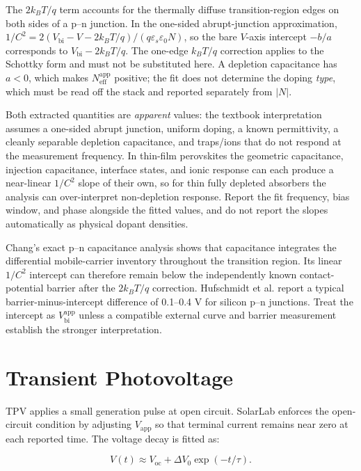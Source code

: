 \documentclass[
  11pt,
  american,
]{report}
\begin{document}
The \(2k_BT/q\) term accounts for the thermally diffuse
transition-region edges on both sides of a p--n junction. In the
one-sided abrupt-junction approximation,
\(1/C^2 = 2(V_\mathrm{bi}-V-2k_BT/q)/(q\varepsilon_s\varepsilon_0 N)\),
so the bare \(V\)-axis intercept \(-b/a\) corresponds to
\(V_\mathrm{bi}-2k_BT/q\). The one-edge \(k_BT/q\) correction applies to
the Schottky form and must not be substituted here. A depletion
capacitance has \(a<0\), which makes \(N_\mathrm{eff}^\mathrm{app}\)
positive; the fit does not determine the doping \emph{type}, which must
be read off the stack and reported separately from \(|N|\).

Both extracted quantities are \emph{apparent} values: the textbook
interpretation assumes a one-sided abrupt junction, uniform doping, a
known permittivity, a cleanly separable depletion capacitance, and
traps/ions that do not respond at the measurement frequency. In
thin-film perovskites the geometric capacitance, injection capacitance,
interface states, and ionic response can each produce a near-linear
\(1/C^2\) slope of their own, so for thin fully depleted absorbers the
analysis can over-interpret non-depletion response. Report the fit
frequency, bias window, and phase alongside the fitted values, and do
not report the slopes automatically as physical dopant densities.

Chang's exact p--n capacitance analysis shows that capacitance
integrates the differential mobile-carrier inventory throughout the
transition region. Its linear \(1/C^2\) intercept can therefore remain
below the independently known contact-potential barrier after the
\(2k_BT/q\) correction. Hufschmidt et al. report a typical
barrier-minus-intercept difference of 0.1--0.4 V for silicon p--n
junctions. Treat the intercept as \(V_\mathrm{bi}^\mathrm{app}\) unless
a compatible external curve and barrier measurement establish the
stronger interpretation.

\hypertarget{transient-photovoltage}{%
\section{Transient Photovoltage}\label{transient-photovoltage}}

TPV applies a small generation pulse at open circuit. SolarLab enforces
the open-circuit condition by adjusting \(V_\mathrm{app}\) so that
terminal current remains near zero at each reported time. The voltage
decay is fitted as:

\[
V(t)
\approx
V_\mathrm{oc}
+\Delta V_0\exp(-t/\tau).
\]
\end{document}
